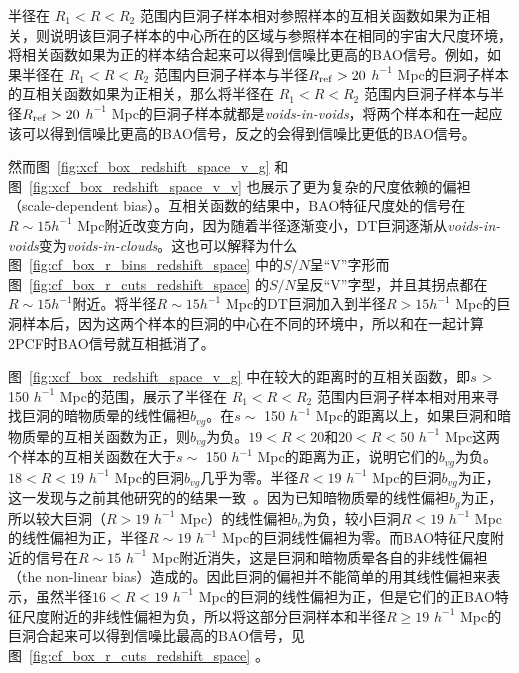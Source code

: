 {半径在 $R_1 < R < R_2$ 范围内巨洞子样本相对参照样本的互相关函数如果为正相关，则说明该巨洞子样本的中心所在的区域与参照样本在相同的宇宙大尺度环境，将相关函数如果为正的样本结合起来可以得到信噪比更高的BAO信号。例如，如果半径在 $R_1 < R < R_2$ 范围内巨洞子样本与半径$R_{\rm ref}>20$ $h^{-1}$ Mpc的巨洞子样本的互相关函数如果为正相关，那么将半径在 $R_1 < R < R_2$ 范围内巨洞子样本与半径$R_{\rm ref}>20$ $h^{-1}$ Mpc的巨洞子样本就都是\textit{voids-in-voids}，将两个样本和在一起应该可以得到信噪比更高的BAO信号，反之的会得到信噪比更低的BAO信号。

然而图~\ref{fig:xcf_box_redshift_space_v_g} 和图~\ref{fig:xcf_box_redshift_space_v_v} 也展示了更为复杂的尺度依赖的偏袒（scale-dependent bias）。互相关函数的结果中，BAO特征尺度处的信号在$R \sim 15 h^{-1}$ Mpc附近改变方向，因为随着半径逐渐变小，DT巨洞逐渐从\textit{voids-in-voids}变为\textit{voids-in-clouds}。这也可以解释为什么图~\ref{fig:cf_box_r_bins_redshift_space} 中的$S/N$呈“V”字形而图~\ref{fig:cf_box_r_cuts_redshift_space} 的$S/N$呈反“V”字型，并且其拐点都在$R \sim 15 h^{-1}$附近。将半径$R \sim 15 h^{-1}$ Mpc的DT巨洞加入到半径$R > 15 h^{-1}$ Mpc的巨洞样本后，因为这两个样本的巨洞的中心在不同的环境中，所以和在一起计算2PCF时BAO信号就互相抵消了。

图~\ref{fig:xcf_box_redshift_space_v_g} 中在较大的距离时的互相关函数，即$s$ > 150 $h^{-1}$ Mpc的范围，展示了半径在 $R_1 < R < R_2$ 范围内巨洞子样本相对用来寻找巨洞的暗物质晕的线性偏袒$b_{vg}$。在$s \sim$ 150  $h^{-1}$ Mpc的距离以上，如果巨洞和暗物质晕的互相关函数为正，则$b_{vg}$为负。$19 < R < 20$和$20 < R < 50$ $h^{-1}$ Mpc这两个样本的互相关函数在大于$s \sim$ 150  $h^{-1}$ Mpc的距离为正，说明它们的$b_{vg}$为负。$18 < R < 19$ $h^{-1}$ Mpc的巨洞$b_{vg}$几乎为零。半径$R < 19$ $h^{-1}$ Mpc的巨洞$b_{vg}$为正，这一发现与之前其他研究的的结果一致~\cite{Hamaus:2013qja}。因为已知暗物质晕的线性偏袒$b_g$为正，所以较大巨洞（$R > 19$ $h^{-1}$ Mpc）的线性偏袒$b_v$为负，较小巨洞$R < 19$ $h^{-1}$ Mpc的线性偏袒为正，半径$R \sim 19$ $h^{-1}$ Mpc的巨洞线性偏袒为零。而BAO特征尺度附近的信号在$R \sim 15$ $h^{-1}$ Mpc附近消失，这是巨洞和暗物质晕各自的非线性偏袒（the non-linear bias）造成的。因此巨洞的偏袒并不能简单的用其线性偏袒来表示，虽然半径$16 < R < 19$ $h^{-1}$ Mpc的巨洞的线性偏袒为正，但是它们的正BAO特征尺度附近的非线性偏袒为负，所以将这部分巨洞样本和半径$R \ge 19$ $h^{-1}$ Mpc的巨洞合起来可以得到信噪比最高的BAO信号，见图~\ref{fig:cf_box_r_cuts_redshift_space} 。

}
